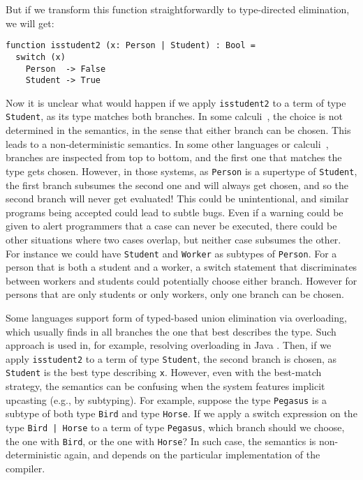 But if we transform this function straightforwardly to type-directed
elimination, we will get:

\begin{lstlisting}
function isstudent2 (x: Person | Student) : Bool =
  switch (x)
    Person  -> False
    Student -> True
\end{lstlisting}

\noindent Now it is unclear what would happen if we apply \lstinline{isstudent2}
to a term of type \lstinline{Student}, as its type matches both branches. In
some calculi~\citep{dunfield2014elaborating}, the choice is not determined in
the semantics, in the sense that either branch can be chosen. This leads to a
non-deterministic semantics. In some other languages or
calculi~\citep{castagna:settheoretic}, branches are inspected from top to
bottom, and the first one that matches the type gets chosen. However, in those
systems, as \lstinline{Person} is a supertype of \lstinline{Student}, the first
branch subsumes the second one and will always get chosen, and so the second
branch will never get evaluated! This could be unintentional, and similar
programs being accepted could lead to subtle bugs. Even if a warning could be
given to alert programmers that a case can never be executed, there could be
other situations where two cases overlap, but neither case subsumes the other.
For instance we could have \lstinline{Student} and \lstinline{Worker} as
subtypes of \lstinline{Person}. For a person that is both a student and a
worker, a switch statement that discriminates between workers and students could
potentially choose either branch. However for persons that are only students or
only workers, only one branch can be chosen.

Some languages support form of typed-based union elimination via overloading,
which usually finds in all branches the one that best describes the type. Such
approach is used in, for example, resolving overloading in Java \cite{javadoc}.
Then, if we apply \lstinline{isstudent2} to a term of type \lstinline{Student},
the second branch is chosen, as \lstinline{Student} is the best type describing
\lstinline{x}. However, even with the best-match strategy, the semantics can be
confusing when the system features implicit upcasting (e.g., by subtyping). For
example, suppose the type \lstinline{Pegasus} is a subtype of both type
\lstinline{Bird} and type \lstinline{Horse}. If we apply a switch expression on
the type \lstinline{Bird | Horse} to a term of type \lstinline{Pegasus}, which
branch should we choose, the one with \lstinline{Bird}, or the one with
\lstinline{Horse}? In such case, the semantics is non-deterministic again, and
depends on the particular implementation of the compiler.


